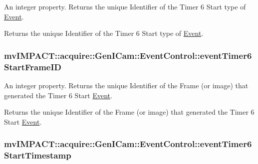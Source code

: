 An integer property. Returns the unique Identifier of the Timer 6 Start type of \hyperlink{classmv_i_m_p_a_c_t_1_1acquire_1_1_event}{Event}. 

Returns the unique Identifier of the Timer 6 Start type of \hyperlink{classmv_i_m_p_a_c_t_1_1acquire_1_1_event}{Event}. \hypertarget{classmv_i_m_p_a_c_t_1_1acquire_1_1_gen_i_cam_1_1_event_control_a7fcc34fb079daa8b9b2c23ad8cd890dd}{
\subsubsection[{event\+Timer6\+Start\+Frame\+I\+D}]{ mv\+I\+M\+P\+A\+C\+T\+::acquire\+::\+Gen\+I\+Cam\+::\+Event\+Control\+::event\+Timer6\+Start\+Frame\+I\+D}}\label{classmv_i_m_p_a_c_t_1_1acquire_1_1_gen_i_cam_1_1_event_control_a7fcc34fb079daa8b9b2c23ad8cd890dd}


An integer property. Returns the unique Identifier of the Frame (or image) that generated the Timer 6 Start \hyperlink{classmv_i_m_p_a_c_t_1_1acquire_1_1_event}{Event}. 

Returns the unique Identifier of the Frame (or image) that generated the Timer 6 Start \hyperlink{classmv_i_m_p_a_c_t_1_1acquire_1_1_event}{Event}. \hypertarget{classmv_i_m_p_a_c_t_1_1acquire_1_1_gen_i_cam_1_1_event_control_a191de3898acdfd25b4871858e0613a43}{
\subsubsection[{event\+Timer6\+Start\+Timestamp}]{ mv\+I\+M\+P\+A\+C\+T\+::acquire\+::\+Gen\+I\+Cam\+::\+Event\+Control\+::event\+Timer6\+Start\+Timestamp}}\label{classmv_i_m_p_a_c_t_1_1acquire_1_1_gen_i_cam_1_1_event_control_a191de3898acdfd25b4871858e0613a43}


